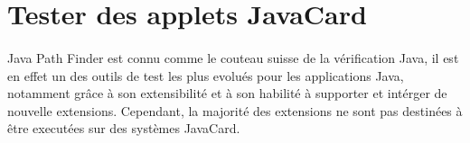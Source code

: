 	\section{Tester des applets JavaCard}
	\paragraph{}
		Java Path Finder est connu comme le couteau suisse de la vérification Java,
		il est en effet un des outils de test les plus evolués pour les applications Java,
		notamment grâce à son extensibilité et à son habilité à supporter et intérger de nouvelle extensions.
		Cependant, la majorité des extensions ne sont pas destinées à être executées sur des systèmes JavaCard.